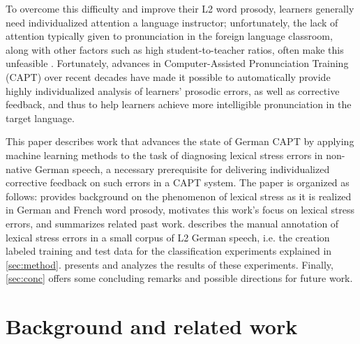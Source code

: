 \documentclass[a4paper]{article}
\begin{document}
  To overcome this difficulty and improve their L2 word prosody, learners generally need individualized attention
  a language instructor; unfortunately, the lack of attention typically given to pronunciation in the foreign language classroom, 
  along with other factors such as high student-to-teacher ratios,
  often make this unfeasible
   \cite{Neri2002,Hirschfeld2007}. %
   Fortunately, advances in Computer-Assisted Pronunciation Training (CAPT) over recent decades have made it possible to automatically provide highly individualized analysis of learners' prosodic errors, as well as corrective feedback, 
   and thus to help learners achieve more intelligible pronunciation in the target language. 
  
  This paper describes work that advances the state of German CAPT by applying machine learning methods to the task of diagnosing lexical stress errors in non-native German speech, a necessary prerequisite for delivering individualized corrective feedback on such errors in a CAPT system. The paper is organized as follows:  provides background on the phenomenon of lexical stress as it is realized in German and French word prosody, motivates 
  this work's focus on lexical stress errors, 
   and summarizes related past work. 
    describes the manual annotation of lexical stress errors in a small corpus of L2 German speech, i.e. the creation labeled training and test data for the classification experiments explained in \cref{sec:method}.  presents and analyzes the results of these experiments. Finally, \cref{sec:conc} offers some concluding remarks and possible directions for future work.



	\section{Background and related work}
	\label{sec:bkgd}
	
\end{document}
